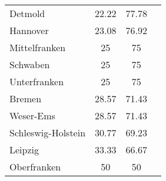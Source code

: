 \begin{table}[H]
\begin{tabularx}{\textwidth}{Xccc}
            Detmold & 22.22 & 77.78 \\
            Hannover & 23.08 & 76.92 \\
            Mittelfranken & 25 & 75 \\
            Schwaben & 25 & 75 \\
            Unterfranken & 25 & 75 \\
            Bremen & 28.57 & 71.43 \\
            Weser-Ems & 28.57 & 71.43 \\
            Schleswig-Holstein & 30.77 & 69.23 \\
            Leipzig & 33.33 & 66.67 \\
            Oberfranken & 50 & 50 \\
        \bottomrule
    \end{tabularx}
\end{table}
        